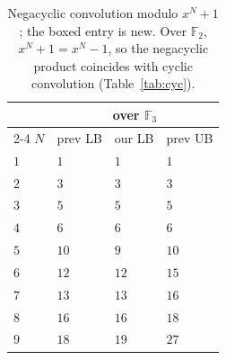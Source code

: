 \documentclass[11pt]{article}
\theoremstyle{definition}
\newcommand{\F}{\mathbb{F}}
\begin{document}
\begin{table}[!ht]
  \centering
  \setlength{\tabcolsep}{12pt}
  \begin{tabular}{llll}
    \toprule
    & \multicolumn{3}{c}{over $\F_3$}                                                                                                       \\
    \cmidrule(lr){2-4}
    $N$ & prev LB                                                     & our LB       & prev UB                                                  \\
    \midrule
    $1$ & $1$                                                         & $1$          & $1$                                                      \\
    $2$ & $3$~\cite{winograd1977some}                                 & $3$          & $3$~\cite{toom1963complexity}                            \\
    $3$ & $5$~\cite{winograd1977some}                                 & $5$          & $5$~\cite{averbuch1991classification,blaser2005complete} \\
    $4$ & $6$~\cite{winograd1977some}                                 & $6$          & $6$~\cite{degroote1983characterization}                  \\
    $5$ & $10$~\cite{blaser2005complete,barbulescu2012finding}        & $9$          & $10$~\cite{cenk2010multiplication}                       \\
    $6$ & $12$~\cite{averbuch1988classification,blaser2005complete}   & $12$         & $15$~\cite{barbulescu2012finding}                             \\
    $7$ & $13$~\cite{degroote1983characterization,blaser2005complete} & $13$         & $16$~\cite{cenk2010multiplication}                       \\
    $8$ & $16$~\cite{blaser2005complete,barbulescu2012finding}        & $16$         & $18$~\cite{cenk2010multiplication}                       \\
    $9$ & $18$~\cite{averbuch1991classification,blaser2005complete}   & $\boxed{19}$ & $27$~\cite{cenk2011multiplication}                       \\
    \bottomrule
  \end{tabular}
  \caption{Negacyclic convolution modulo $x^N+1$; the boxed entry is
    new. Over $\F_2$, $x^N+1=x^N-1$, so the negacyclic product coincides with cyclic
  convolution (Table~\ref{tab:cyc}).}
  \label{tab:nega}
\end{table}
\clearpage
\end{document}
